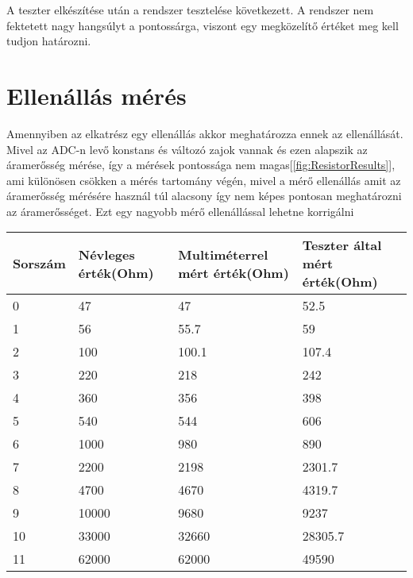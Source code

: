 A teszter elkészítése után a rendszer tesztelése következett.
A rendszer nem fektetett nagy hangsúlyt a pontossárga, viszont egy 
megközelítő értéket meg kell tudjon határozni.

\section{Ellenállás mérés}

Amennyiben az elkatrész egy ellenállás akkor meghatározza ennek az ellenállását.
Mivel az ADC-n levő konstans és változó zajok vannak és ezen alapszik 
az áramerősség mérése, így a mérések pontossága nem magas[\ref{fig:ResistorResults}], ami különösen csökken a mérés tartomány
végén, mivel a mérő ellenállás amit az áramerősség mérésére használ túl alacsony így
nem képes pontosan meghatározni az áramerősséget. Ezt egy nagyobb mérő ellenállással
lehetne korrigálni


\begin{table}[H]
    \begin{tabular}{|l|l|l|l|}
    \hline
    Sorszám & Névleges érték(Ohm) & Multiméterrel mért érték(Ohm) & Teszter által mért érték(Ohm) \\ \hline
    0       & 47             & 47                       & 52.5                     \\ \hline
    1       & 56             & 55.7                     & 59                       \\ \hline
    2       & 100            & 100.1                    & 107.4                    \\ \hline
    3       & 220            & 218                      & 242                      \\ \hline
    4       & 360            & 356                      & 398                      \\ \hline
    5       & 540            & 544                      & 606                      \\ \hline
    6       & 1000           & 980                      & 890                      \\ \hline
    7       & 2200           & 2198                     & 2301.7                   \\ \hline
    8       & 4700           & 4670                     & 4319.7                   \\ \hline
    9       & 10000          & 9680                     & 9237                     \\ \hline
    10      & 33000          & 32660                    & 28305.7                  \\ \hline
    11      & 62000          & 62000                    & 49590                    \\ \hline
    \end{tabular}
    \end{table}

